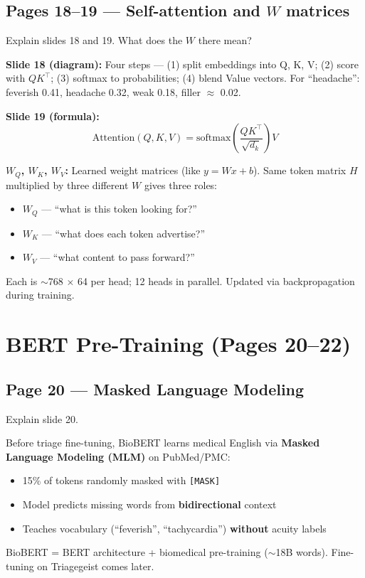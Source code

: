 \documentclass[11pt]{article}
\begin{document}
\subsection{Pages 18--19 --- Self-attention and $W$ matrices}

\begin{questionbox}
Explain slides 18 and 19. What does the $W$ there mean?
\end{questionbox}

\begin{answerbox}
\textbf{Slide 18 (diagram):} Four steps --- (1) split embeddings into Q, K, V; (2) score with $QK^\top$; (3) softmax to probabilities; (4) blend Value vectors. For ``headache'': feverish 0.41, headache 0.32, weak 0.18, filler $\approx$ 0.02.

\textbf{Slide 19 (formula):}
\[
\mathrm{Attention}(Q,K,V) = \mathrm{softmax}\!\left(\frac{QK^\top}{\sqrt{d_k}}\right)V
\]

\textbf{$W_Q$, $W_K$, $W_V$:} Learned weight matrices (like $y = Wx + b$). Same token matrix $H$ multiplied by three different $W$ gives three roles:
\begin{itemize}
  \item $W_Q$ --- ``what is this token looking for?''
  \item $W_K$ --- ``what does each token advertise?''
  \item $W_V$ --- ``what content to pass forward?''
\end{itemize}
Each is $\sim$768 $\times$ 64 per head; 12 heads in parallel. Updated via backpropagation during training.
\end{answerbox}

\section{BERT Pre-Training (Pages 20--22)}

\subsection{Page 20 --- Masked Language Modeling}

\begin{questionbox}
Explain slide 20.
\end{questionbox}

\begin{answerbox}
Before triage fine-tuning, BioBERT learns medical English via \textbf{Masked Language Modeling (MLM)} on PubMed/PMC:
\begin{itemize}
  \item 15\% of tokens randomly masked with \texttt{[MASK]}
  \item Model predicts missing words from \textbf{bidirectional} context
  \item Teaches vocabulary (``feverish'', ``tachycardia'') \textbf{without} acuity labels
\end{itemize}
BioBERT = BERT architecture + biomedical pre-training ($\sim$18B words). Fine-tuning on Triagegeist comes later.
\end{answerbox}
\end{document}
